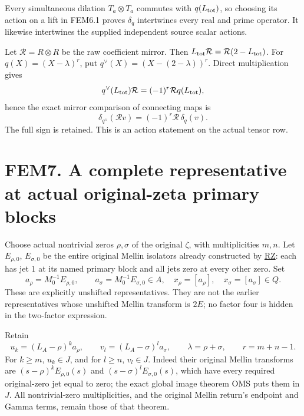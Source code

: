 Every simultaneous dilation \(T_a\otimes T_a\) commutes with
\(q(L_{\rm tot})\), so choosing its action on a lift in FEM6.1 proves
\(\delta_q\) intertwines every real and prime operator. It likewise
intertwines the supplied independent source scalar actions.

Let \(\mathcal R=R\otimes R\) be the raw coefficient mirror. Then
\(L_{\rm tot}\mathcal R=\mathcal R(2-L_{\rm tot})\). For
\(q(X)=(X-\lambda)^r\), put \(q^\vee(X)=(X-(2-\lambda))^r\). Direct
multiplication gives \[
q^\vee(L_{\rm tot})\mathcal R
=(-1)^r\mathcal R q(L_{\rm tot}),
\] hence the exact mirror comparison of connecting maps is \[
\delta_{q^\vee}(\mathcal Rv)
=(-1)^r\mathcal R\,\delta_q(v).
\tag{FEM6.3}
\] The full sign is retained. This is an action statement on the actual
tensor row.

\section{FEM7. A complete representative at actual original-zeta primary
blocks}\label{fem7.-a-complete-representative-at-actual-original-zeta-primary-blocks}

Choose actual nontrivial zeros \(\rho,\sigma\) of the original
\(\zeta\), with multiplicities \(m,n\). Let \(E_{\rho,0}\),
\(E_{\sigma,0}\) be the entire original Mellin isolators already
constructed by
\href{https://github.com/KokunoYumeto/zeta-function-research-reader/blob/36a82ecca98addb8a98b48204e349737856c7223/workbenches/splitzero-tandem/continuations/20260924-cohomology-weight-and-character-lifts/gct-weight-control/proofs/ORIGINAL_ZETA_RESOLVENT_AND_PROJECTORS.md}{RZ}:
each has jet \(1\) at its named primary block and all jets zero at every
other zero. Set \[
a_\rho=M_0^{-1}E_{\rho,0},\qquad
a_\sigma=M_0^{-1}E_{\sigma,0}\in A,
\quad x_\rho=[a_\rho],\quad x_\sigma=[a_\sigma]\in Q.
\tag{FEM7.1}
\] These are explicitly unshifted representatives. They are not the
earlier representatives whose unshifted Mellin transform is \(2E\); no
factor four is hidden in the two-factor expression.

Retain \[
u_k=(L_A-\rho)^k a_\rho,\qquad
v_l=(L_A-\sigma)^l a_\sigma,\qquad
\lambda=\rho+\sigma,\qquad r=m+n-1.
\] For \(k\geq m\), \(u_k\in J\), and for \(l\geq n\), \(v_l\in J\).
Indeed their original Mellin transforms are \((s-\rho)^kE_{\rho,0}(s)\)
and \((s-\sigma)^lE_{\sigma,0}(s)\), which have every required
original-zero jet equal to zero; the exact global image theorem OMS puts
them in \(J\). All nontrivial-zero multiplicities, and the original
Mellin return's endpoint and Gamma terms, remain those of that theorem.

